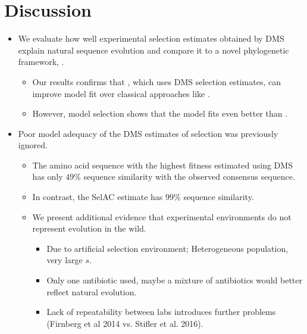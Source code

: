 \documentclass[12pt]{article}
\begin{document}
\section*{Discussion}
\begin{itemize}
	\item We evaluate how well experimental selection estimates obtained by DMS explain natural sequence evolution and compare it to a novel phylogenetic framework, \selac.
	\begin{itemize}
		\item Our results confirms that \phydms, which uses DMS selection estimates, can improve model fit over classical approaches like \gy.
		\item However, model selection shows that the \selac model fits even better than \phydms.
	\end{itemize}
	\item Poor model adequacy of the DMS estimates of selection was previously ignored.
	\begin{itemize}
		\item The amino acid sequence with the highest fitness estimated using DMS has only $49 \%$ sequence similarity with the observed consensus sequence.
		\item In contrast, the SelAC estimate has $99 \%$ sequence similarity. 
		\item We present additional evidence that experimental environments do not represent evolution in the wild.
 		\begin{itemize}
			\item Due to artificial selection environment; Heterogeneous population, very large $s$. 
			\item Only one antibiotic used, maybe a mixture of antibiotics would better reflect natural evolution.
			\item Lack of repeatability between labs introduces further problems (Firnberg et al 2014 vs. Stifler et al. 2016).
		\end{itemize}
	\end{itemize}


\end{itemize}
\end{document}
